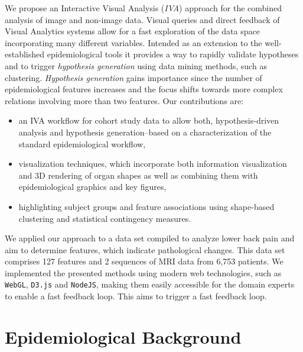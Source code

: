 \documentclass[journal]{style/vgtc} 			          %
\begin{document}
We propose an Interactive Visual Analysis (\emph{IVA}) approach \cite{Thomas2005} for the combined analysis of image and non-image data.
%
Visual queries and direct feedback of Visual Analytics systems allow for a fast exploration of the data space incorporating many different variables.
%
Intended as an extension to the well-established epidemiological tools it provides a way to rapidly validate hypotheses and to trigger \emph{hypothesis generation} using data mining methods, such as clustering.
%
\emph{Hypothesis generation} gains importance since the number of epidemiological features increases and the focus shifts towards more complex relations involving more than two features. Our contributions are:
\begin{itemize} \itemsep0.1em
	\item an IVA workflow for cohort study data to allow both, hypothesis-driven analysis and hypothesis generation--based on a characterization of the standard epidemiological workflow,
	\item visualization techniques, which incorporate both information visualization and 3D rendering of organ shapes as well as combining them with epidemiological graphics and key figures,
	\item highlighting subject groups and feature associations using shape-based clustering and statistical contingency measures.
\end{itemize}
We applied our approach to a data set compiled to analyze lower back pain and aim to determine features, which indicate pathological changes.
%
This data set comprises 127 features and 2 sequences of MRI data from 6,753 patients.
%
We implemented the presented methods using modern web technologies, such as \texttt{WebGL}, \texttt{D3.js} and \texttt{NodeJS}, making them easily accessible for the domain experts to enable a fast feedback loop.
%
This aims to trigger a fast feedback loop. %

\section{Epidemiological Background} \label{MedicalAndTechnicalBackground}
\end{document}

